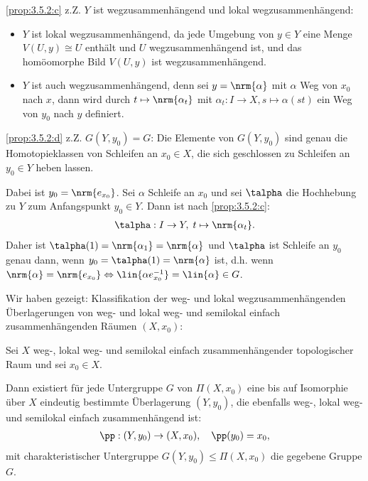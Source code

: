 \ref{prop:3.5.2:c} z.Z. $Y$ ist wegzusammenhängend und lokal wegzusammenhängend:
\begin{itemize}
  \item $Y$ ist lokal wegzusammenhängend, da jede Umgebung von $y\in Y$ eine
  Menge $V(U,y)\cong U$ enthält und $U$ wegzusammenhängend ist, und das
  homöomorphe Bild $V(U,y)$ ist wegzusammenhängend.
  \item $Y$ ist auch wegzusammenhängend, denn sei $y=\nrm{\alpha}$ mit $\alpha$
  Weg von $x_0$ nach $x$, dann wird durch $t\mapsto \nrm{\alpha_t}$ mit
  $\alpha_t : I\to X, s\mapsto \alpha(st)$ ein Weg von $y_0$ nach $y$ definiert.
\end{itemize}
\ref{prop:3.5.2:d} z.Z. $G(Y,y_0)=G$:
Die Elemente von $G(Y,y_0)$ sind genau die Homotopieklassen von Schleifen an
$x_0\in X$, die sich geschlossen zu Schleifen an $y_0\in Y$ heben lassen.

Dabei ist $y_0=\nrm{e_{x_0}}$. Sei $\alpha$ Schleife an $x_0$ und sei $\talpha$
die Hochhebung zu $Y$ zum Anfangspunkt $y_0\in Y$. Dann ist nach
\ref{prop:3.5.2:c}:
\begin{align*}
\talpha: I\to Y,\;t\mapsto\nrm{\alpha_t}.
\end{align*}
Daher ist $\talpha(1) = \nrm{\alpha_1} = \nrm{\alpha}$ und $\talpha$ ist
Schleife an $y_0$ genau dann, wenn $y_0 = \talpha(1) = \nrm{\alpha}$ ist, d.h.
wenn $\nrm{\alpha} = \nrm{e_{x_0}} \Leftrightarrow \lin{\alpha e_{x_0}^{-1}} =
\lin{\alpha}\in G$.\qedhere

Wir haben gezeigt:
Klassifikation der weg- und lokal wegzusammenhängenden Überlagerungen von weg-
und lokal weg- und semilokal einfach zusammenhängenden Räumen
$(X,x_0)$:

\begin{prop}
\label{prop:3.5.4}
Sei $X$ weg-, lokal weg- und semilokal einfach zusammenhängender topologischer
Raum und sei $x_0\in X$.

Dann existiert für jede Untergruppe $G$ von $\Pi(X,x_0)$ eine bis auf
Isomorphie über $X$ eindeutig bestimmte Überlagerung $(Y,y_0)$, die ebenfalls
weg-, lokal weg- und semilokal einfach zusammenhängend ist:
\begin{align*}
\pp: (Y,y_0)\to (X,x_0),\quad \pp(y_0) = x_0,
\end{align*}
mit charakteristischer Untergruppe $G(Y,y_0)\leqslant \Pi(X,x_0)$ die gegebene
Gruppe $G$.\fishhere
\end{prop}

